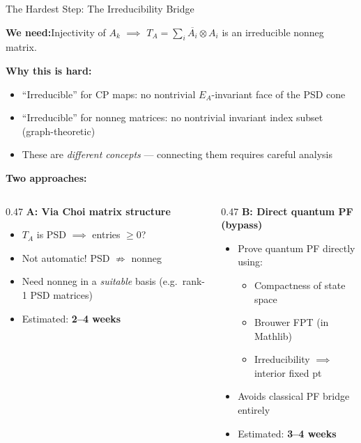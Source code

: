 \documentclass[aspectratio=169,10pt]{beamer}
\begin{document}
\begin{frame}{The Hardest Step: The Irreducibility Bridge}

\textbf{We need:}\quad Injectivity of $A_k$ $\implies$ $T_A = \sum_i \overline{A_i} \otimes A_i$ is an irreducible nonneg matrix.

\vspace{0.3em}
\textbf{Why this is hard:}
\begin{itemize}\itemsep1pt
  \item ``Irreducible'' for CP maps: no nontrivial $E_A$-invariant face of the PSD cone
  \item ``Irreducible'' for nonneg matrices: no nontrivial invariant index subset (graph-theoretic)
  \item These are \emph{different concepts} --- connecting them requires careful analysis
\end{itemize}

\vspace{0.2em}
\textbf{Two approaches:}

\begin{columns}[T]
\begin{column}{0.47\textwidth}
\textbf{A: Via Choi matrix structure}
\begin{itemize}\small\itemsep1pt
  \item $T_A$ is PSD $\implies$ entries $\geq 0$?
  \item \textcolor{softred}{Not automatic!} PSD $\not\Rightarrow$ nonneg
  \item Need nonneg in a \emph{suitable} basis (e.g.\ rank-1 PSD matrices)
  \item Estimated: \textbf{2--4 weeks}
\end{itemize}
\end{column}
\begin{column}{0.47\textwidth}
\textbf{B: Direct quantum PF (bypass)}
\begin{itemize}\small\itemsep1pt
  \item Prove quantum PF directly using:
    \begin{itemize}\scriptsize\itemsep0pt
      \item Compactness of state space
      \item Brouwer FPT (in Mathlib)
      \item Irreducibility $\implies$ interior fixed pt
    \end{itemize}
  \item \textcolor{leangreen}{Avoids classical PF bridge entirely}
  \item Estimated: \textbf{3--4 weeks}
\end{itemize}
\end{column}
\end{columns}
\end{frame}
\end{document}
